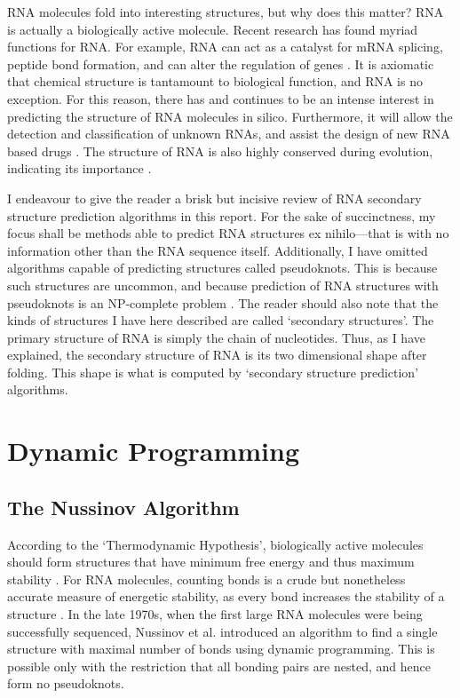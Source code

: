 \documentclass[12pt, a4paper]{article}
\begin{document}
RNA molecules fold into interesting structures, but why does this matter? RNA is actually a biologically active molecule. Recent research has found myriad functions for RNA. For example, RNA can act as a catalyst for mRNA splicing, peptide bond formation, and can alter the regulation of genes
\cite{xu2012statistical}. It is axiomatic that chemical structure is tantamount to biological function, and RNA is no exception. For this reason, there has and continues to be an intense
interest in predicting the structure of RNA
molecules in silico. Furthermore, it will allow the detection and classification of unknown RNAs, and assist the design of new RNA based drugs \cite{condon2003problems}. The structure of RNA
is also highly conserved during evolution, indicating its importance \cite{hofacker2008rna}.

I endeavour to give the reader a brisk but incisive review of RNA secondary structure prediction algorithms in this report. For the sake of succinctness, my focus shall be methods able to predict RNA structures ex nihilo---that is with no information other than the RNA sequence itself. Additionally, I have omitted algorithms capable of predicting structures called pseudoknots. This is because such structures are uncommon, and because prediction of RNA structures with pseudoknots is an NP-complete problem \cite{lyngso2000rna}. The reader should also note that the kinds of structures I have here described are called `secondary structures'. The primary structure of RNA is simply the chain of nucleotides. Thus, as I have explained, the secondary structure of RNA is its two dimensional shape after folding. This shape is what is computed by `secondary structure prediction' algorithms.

\section{Dynamic Programming}
\subsection{The Nussinov Algorithm}
According to the `Thermodynamic Hypothesis', biologically active molecules should form structures that have minimum free energy and thus maximum stability \cite{anfinsen1973principles}. For RNA molecules, counting bonds is a crude but nonetheless accurate measure of energetic stability, as every bond increases the
stability of a structure \cite{nussinov1978algorithms}. In the late 1970s, when the first large RNA molecules
were being successfully sequenced, Nussinov et al. \cite{nussinov1978algorithms} introduced an algorithm to find a single structure with maximal number of bonds using dynamic programming. This is possible only with the restriction that all bonding pairs are nested, and hence form no pseudoknots.
\end{document}
